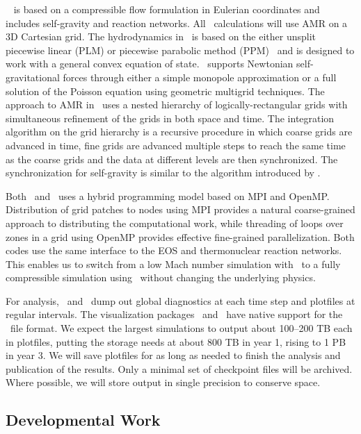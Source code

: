 \castro~\cite{castro} is based on a compressible flow formulation in
Eulerian coordinates and includes self-gravity and reaction networks.
All \castro\ calculations will use AMR on a 3D Cartesian grid.  The
hydrodynamics in \castro\ is based on the either unsplit piecewise
linear (PLM) or piecewise parabolic method (PPM)~\cite{ppmunsplit} and
is designed to work with a general convex equation of state.
\castro\ supports Newtonian self-gravitational forces through either a
simple monopole approximation or a full solution of the Poisson
equation using geometric multigrid techniques.  The approach to AMR in
\castro\ uses a nested hierarchy of logically-rectangular grids with
simultaneous refinement of the grids in both space and time.  The
integration algorithm on the grid hierarchy is a recursive procedure
in which coarse grids are advanced in time, fine grids are advanced
multiple steps to reach the same time as the coarse grids and the data
at different levels are then synchronized.  The synchronization for
self-gravity is similar to the algorithm introduced by
\cite{miniati-colella}.  

Both \maestro\ and \castro\ uses a hybrid
programming model based on MPI and OpenMP.  Distribution of grid
patches to nodes using MPI provides a natural coarse-grained approach
to distributing the computational work, while threading of loops over
zones in a grid using OpenMP provides effective fine-grained parallelization.
Both codes use the same interface to the EOS and 
thermonuclear reaction networks.  This enables us to
switch from a low Mach number simulation with \maestro\ to a fully
compressible simulation using \castro\ without changing the underlying
physics.  

For analysis, \maestro\ and \castro\ dump out global
diagnostics at each time step and plotfiles at regular intervals.  The
visualization packages \visit\ and \yt\ have native support for the
\boxlib\ file format.  We expect the largest simulations
to output about 100--200 TB each in plotfiles, putting the storage needs at about
800 TB in year 1, rising to 1 PB in year 3.  We will save plotfiles for as long as needed to finish the
analysis and publication of the results.  Only a minimal set of checkpoint
files will be archived.  Where possible, we will store output in single precision
to conserve space.



\subsection{Developmental Work}

